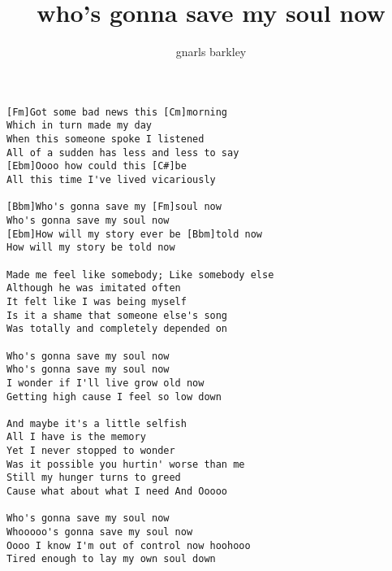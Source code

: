 \author{gnarls barkley}
\title{who's gonna save my soul now}
\maketitle
\begin{verbatim}
[Fm]Got some bad news this [Cm]morning
Which in turn made my day
When this someone spoke I listened
All of a sudden has less and less to say
[Ebm]Oooo how could this [C#]be
All this time I've lived vicariously

[Bbm]Who's gonna save my [Fm]soul now
Who's gonna save my soul now
[Ebm]How will my story ever be [Bbm]told now
How will my story be told now

Made me feel like somebody; Like somebody else
Although he was imitated often
It felt like I was being myself
Is it a shame that someone else's song
Was totally and completely depended on

Who's gonna save my soul now
Who's gonna save my soul now
I wonder if I'll live grow old now
Getting high cause I feel so low down

And maybe it's a little selfish
All I have is the memory
Yet I never stopped to wonder
Was it possible you hurtin' worse than me
Still my hunger turns to greed
Cause what about what I need And Ooooo

Who's gonna save my soul now
Whooooo's gonna save my soul now
Oooo I know I'm out of control now hoohooo
Tired enough to lay my own soul down
\end{verbatim}